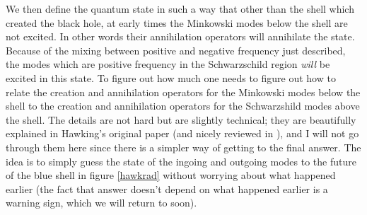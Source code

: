\documentclass[12pt]{article}
\begin{document}
We then define the quantum state in such a way that other than the shell which created the black hole, at early times the Minkowski modes below the shell are not excited.  In other words their annihilation operators will annihilate the state.  Because of the mixing between positive and negative frequency just described, the modes which are positive frequency in the Schwarzschild region \textit{will} be excited in this state.  To figure out how much one needs to figure out how to relate the creation and annihilation operators for the Minkowski modes below the shell to the creation and annihilation operators for the Schwarzshild modes above the shell.  The details are not hard but are slightly technical; they are beautifully explained in Hawking's original paper \cite{Hawking:1974sw} (and nicely reviewed in \cite{Wald:1984rg}), and I will not go through them here since there is a simpler way of getting to the final answer.  The idea is to simply guess the state of the ingoing and outgoing modes to the future of the blue shell in figure \ref{hawkrad} without worrying about what happened earlier (the fact that answer doesn't depend on what happened earlier is a warning sign, which we will return to soon).  
\end{document}
